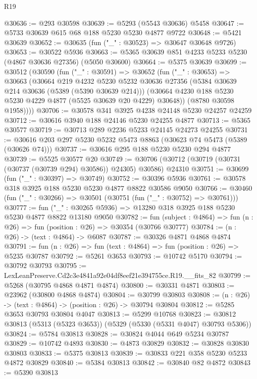 \begin{lexlean}{R19}
\begin{coremodule}
@30636 := @293 @30598
@30639 := @5293 (@5543 @30636) @5458
@30647 := @5733 @30639 @615 @68 @188 @5230 @5230 @4877 @9722
@30648 := @5421 @30639
@30652 := @30635 (fun ("_" : @30523) => @30647 @30648 @9726)
@30653 := @30522 @5936
@30663 := @5365 @30639 @851 @4233 @5233 @5230 (@4867 @30636 @27356) (@5050 @30600)
@30664 := @5375 @30639
@30699 := @30512
    (@30590
      (fun ("_" : @30591) =>
      @30652
        (fun ("_" : @30653) =>
        @30663
          (@30664
            @219
            @4232
            @5230
            @5232
            @30636
            @27356
            (@5384 @30639 @214 @30636 (@5389 (@5390 @30639 @214)))
            (@30664 @4230 @188 @5230 @5230 @4229 @4877 (@5525 @30639 @20 @4229) @30648))
          (@8780 @30598 @1958))))
@30706 := @30578 @341 @3925 @4238 @24148 @5230 @24257 @24259
@30712 := @30616 @3940 @188 @24146 @5230 @24255 @4877
@30713 := @5365 @30577
@30719 := @30713 @289 @2236 @5233 @24145 @24273 @24255
@30731 := @30616 @203 @297 @5230 @5232 @5473 @8863 (@30623 @74 @5473 (@5389 (@30626 @74)))
@30737 := @30616 @295 @188 @5230 @5230 @294 @4877
@30739 := @5525 @30577 @20
@30749 := @30706 (@30712 (@30719 (@30731 (@30737 (@30739 @294) @30586)) @24305) @30586) @24310
@30751 := @30699 (fun ("_" : @30397) => @30749)
@30752 := @30396 @5936
@30761 := @30578 @318 @3925 @188 @5230 @5230 @4877 @8822 @30586 @9050
@30766 := @30460 (fun ("_" : @30266) => @30501 (@30751 (fun ("_" : @30752) => @30761)))
@30777 := fun ("_" : @30265 @5936) => @13280 @318 @3925 @188 @5230 @5230 @4877 @8822 @13180 @9050
@30782 := fun (subject : @4864) => fun (n : @26) => fun (position : @26) => @30354 (@30766 @30777)
@30784 := (n : @26) -> (text : @4864) -> @6087
@30787 := @30326 @4871 @4868 @4874
@30791 := fun (n : @26) => fun (text : @4864) => fun (position : @26) => @5235 @30787
@30792 := @5261 @3653
@30793 := @10742 @5170
@30794 := @30792 @30793
@30795 := LexLeanPreserve.Cd2c3e4841a92e04df8eef21e394755ce.R19.__fits_82
@30799 := @5268 (@30795 @4868 @4871 @4874)
@30800 := @30331 @4871
@30803 := @23962 (@30800 @4868 @4874)
@30804 := @30799 @30803
@30808 := (n : @26) -> (text : @4864) -> (position : @26) -> @30794 @30804
@30812 := @5285 @3653 @30793 @30804 @4047
@30813 := @5299 @10768
@30823 := @30812 @30813 (@5313 (@5323 @3653)) (@5329 (@5330 (@5331 @4047) @30793 @5306))
@30824 := @5784 @30813
@30828 := @30824 @4044 @649 @5234 @30787
@30829 := @10742 @4893
@30830 := @4873 @30829
@30832 := @30828 @30830 @30803
@30833 := @5375 @30813
@30839 := @30833 @221 @358 @5230 @5233 @4872 @30829
@30840 := @5384 @30813
@30842 := @30840 @82 @4872
@30843 := @5390 @30813

\end{coremodule}
\end{lexlean}
